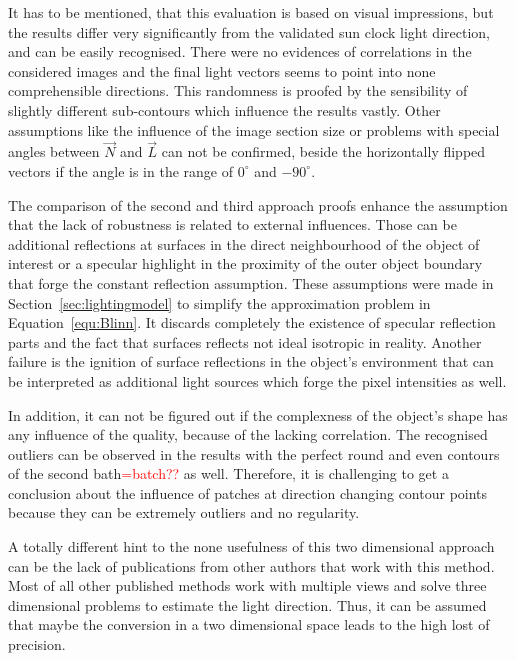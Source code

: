 It has to be mentioned, that this evaluation is based on visual impressions, but the results differ very significantly from the validated sun clock light direction, and can be easily recognised. There were no evidences of correlations in the considered images and the final light vectors seems to point into none comprehensible directions. This randomness is proofed by the sensibility of slightly different sub-contours which influence the results vastly. Other assumptions like the influence of the image section size or problems with special angles between $\vec{N}$ and $\vec{L}$ can not be confirmed, beside the horizontally flipped vectors if the angle is in the range of  $0^\circ $ and $-90^\circ$. 

The comparison of the second and third approach proofs enhance the assumption that the lack of robustness is related to external influences. Those can be additional reflections at surfaces in the direct neighbourhood of the object of interest or a specular highlight in the proximity of the outer object boundary that forge the constant reflection assumption. These assumptions were made in Section~\ref{sec:lightingmodel} to simplify the approximation problem in Equation~\ref{equ:Blinn}. It discards completely the existence of specular reflection parts and the fact that surfaces reflects not ideal isotropic in reality. Another failure is the ignition of surface reflections in the object's environment that can be interpreted as additional light sources which forge the pixel intensities as well. 

In addition, it can not be figured out if the complexness of the object's shape has any influence of the quality, because of the lacking correlation. The recognised outliers can be observed in the results with the perfect round and even contours of the second bath\textcolor{red}{=batch??} as well. Therefore, it is challenging to get a conclusion about the influence of patches at direction changing contour points because they can be extremely outliers and no regularity.

A totally different hint to the none usefulness of this two dimensional approach can be the lack of publications from other authors that work with this method. Most of all other published methods work with multiple views and solve three dimensional problems to estimate the light direction. Thus, it can be assumed that maybe the conversion in a two dimensional space leads to the high lost of precision.

